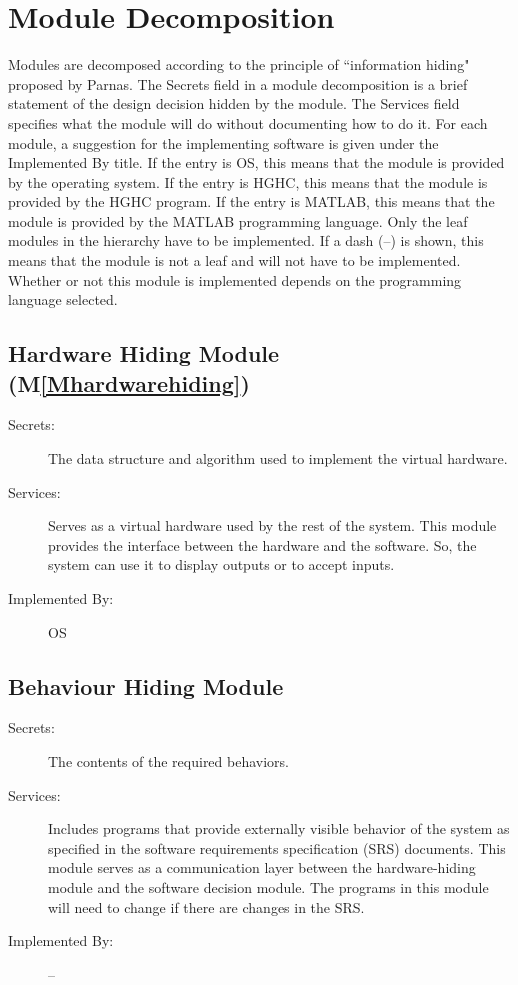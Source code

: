 \documentclass[12pt]{article}
\begin{document}
\section{Module Decomposition}
\label{Sec:MD}
Modules are decomposed according to the principle of ``information hiding" proposed by Parnas. The Secrets field in a module decomposition is a brief statement of the design decision hidden by the module. The Services field specifies what the module will do without documenting how to do it. For each module, a suggestion for the implementing software is given under the Implemented By title. If the entry is OS, this means that the module is provided by the operating system. If the entry is HGHC, this means that the module is provided by the HGHC program. If the entry is MATLAB, this means that the module is provided by the MATLAB programming language. Only the leaf modules in the hierarchy have to be implemented. If a dash (--) is shown, this means that the module is not a leaf and will not have to be implemented. Whether or not this module is implemented depends on the programming language selected.
\subsection{Hardware Hiding Module (M\ref{Mhardwarehiding})}
\label{Sec:HHM()}
\begin{description}
\item[Secrets:]The data structure and algorithm used to implement the virtual hardware.
\item[Services:]Serves as a virtual hardware used by the rest of the system. This module provides the interface between the hardware and the software. So, the system can use it to display outputs or to accept inputs.
\item[Implemented By:]OS
\end{description}
\subsection{Behaviour Hiding Module}
\label{Sec:BHM}
\begin{description}
\item[Secrets:]The contents of the required behaviors.
\item[Services:]Includes programs that provide externally visible behavior of the system as specified in the software requirements specification (SRS) documents. This module serves as a communication layer between the hardware-hiding module and the software decision module. The programs in this module will need to change if there are changes in the SRS.
\item[Implemented By:]--
\end{description}
\end{document}
